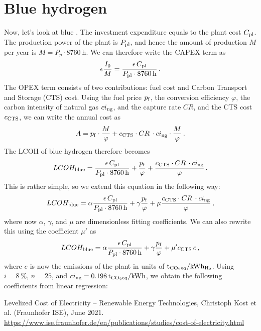 \documentclass[%
 draft,
 aapm,
 mph,%
 amsmath,amssymb,
 reprint,%
]{revtex4-2}
\begin{document}
\section{Blue hydrogen}
Now, let's look at blue . The investment expenditure equals to the plant cost $C_{\mathrm{pl}}$. The production power of the plant is $P_{\mathrm{pl}}$, and hence the amount of production $M$ per year is $M = P_p \cdot \SI{8760}{\hour}$. We can therefore write the CAPEX term as
\begin{equation}
    \epsilon \frac{I_0}{M} = \frac{\epsilon\,C_{\mathrm{pl}}}{P_{\mathrm{pl}} \cdot \SI{8760}{\hour}} \,.
\end{equation}
The OPEX term consists of two contributions: fuel cost and Carbon Transport and Storage (CTS) cost. Using the fuel price $p_{\mathrm{f}}$, the conversion efficiency $\varphi$, the carbon intensity of natural gas $ci_{\mathrm{ng}}$, and the capture rate $CR$, and the CTS cost $c_{\mathrm{CTS}}$, we can write the annual cost as
\begin{equation}
    A = p_{\mathrm{f}} \cdot \frac{M}{\varphi} + c_{\mathrm{CTS}} \cdot CR \,\cdot ci_{\mathrm{ng}} \cdot \frac{M}{\varphi} \,.
\end{equation}
The LCOH of blue hydrogen therefore becomes
\begin{equation}
    LCOH_{\mathrm{blue}} = \frac{\epsilon \, C_{\mathrm{pl}}}{P_{\mathrm{pl}} \cdot \SI{8760}{\hour}} + \frac{p_{\mathrm{f}}}{\varphi} + \frac{c_{\mathrm{CTS}} \cdot CR \,\cdot ci_{\mathrm{ng}}}{\varphi} \,.
\end{equation}
This is rather simple, so we extend this equation in the following way:
\begin{equation}
    LCOH_{\mathrm{blue}} = \alpha \frac{\epsilon \, C_{\mathrm{pl}}}{P_{\mathrm{pl}} \cdot \SI{8760}{\hour}} + \gamma \frac{p_{\mathrm{f}}}{\varphi} + \mu\frac{c_{\mathrm{CTS}} \cdot CR \,\cdot ci_{\mathrm{ng}}}{\varphi} \,,
\end{equation}
where now $\alpha$, $\gamma$, and $\mu$ are dimensionless fitting coefficients. We can also rewrite this using the coefficient $\mu'$ as
\begin{equation}
    LCOH_{\mathrm{blue}} = \alpha \frac{\epsilon \, C_{\mathrm{pl}}}{P_{\mathrm{pl}} \cdot \SI{8760}{\hour}} + \gamma \frac{p_{\mathrm{f}}}{\varphi} + \mu'c_{\mathrm{CTS}}\,e \,,
\end{equation}
where $e$ is now the emissions of the plant in units of $\si{\tonne_{\ce{CO2}eq}\per\kWh_{\ce{H2}}}$. Using $i = \SI{8}{\percent}$, $n = 25$, and $\cing = \SI{0.198}{\tonne_{\ce{CO2}eq}\per\kWh}$, we obtain the following coefficients from linear regression:

\begin{table}[h!]
\end{table}




\begin{thebibliography}{9}

  Levelized Cost of Electricity -- Renewable Energy Technologies,
  Christoph Kost et al. (Fraunhofer ISE),
  June 2021.
  \url{https://www.ise.fraunhofer.de/en/publications/studies/cost-of-electricity.html}
\end{thebibliography}
\end{document}
